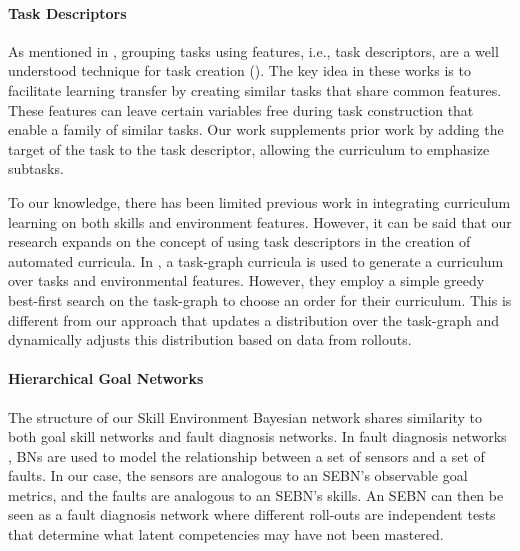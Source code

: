 \paragraph{Task Descriptors}
As mentioned in , grouping tasks using features, i.e., task descriptors, are a well understood technique for task creation (\cite{rostamiEtAl20.jair.usingTaskDescriptions,isele2016task,narvekar2016source,konidaris2012transfer}).  The key idea in these works is to facilitate learning transfer by creating similar tasks that share common features.  These features can leave certain variables free during task construction that enable a family of similar tasks. 
Our work supplements prior work by adding the target of the task to the task descriptor, allowing the curriculum to emphasize subtasks.

To our knowledge, there has been limited previous work in integrating curriculum learning on both skills and environment features. However, it can be said that our research expands on the concept of using task descriptors in the creation of automated curricula. In \cite{patra2023relating}, a task-graph curricula is used to generate a curriculum over tasks and environmental features. However, they employ a simple greedy best-first search on the task-graph to choose an order for their curriculum. This is different from our approach that updates a distribution over the task-graph and dynamically adjusts this distribution based on data from rollouts.

\paragraph{Hierarchical Goal Networks}

The structure of our Skill Environment Bayesian network shares similarity to both goal skill networks and fault diagnosis networks. In fault diagnosis networks \cite{cai2017bayesian}, BNs are used to model the relationship between a set of sensors and a set of faults. In our case, the sensors are analogous to an SEBN's observable goal metrics, and the faults are analogous to an SEBN's skills. An SEBN can then be seen as a fault diagnosis network where different roll-outs are independent tests that determine what latent competencies may have not been mastered.




